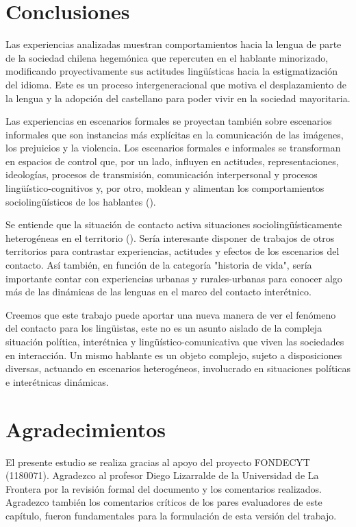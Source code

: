 \documentclass[output=paper]{../langscibook}
\begin{document}
\section{Conclusiones}\label{sec:olate:7}


Las experiencias analizadas muestran comportamientos hacia la lengua de parte de la sociedad chilena hegemónica que repercuten en el hablante minorizado, modificando proyectivamente sus actitudes lingüísticas hacia la estigmatización del idioma. Este es un proceso intergeneracional que motiva el desplazamiento de la lengua y la adopción del castellano para poder vivir en la sociedad mayoritaria.

Las experiencias en escenarios formales se proyectan también sobre escenarios informales que son instancias más explícitas en la comunicación de las imágenes, los prejuicios y la violencia. Los escenarios formales e informales se transforman en espacios de control que, por un lado, influyen en actitudes, representaciones, ideologías, procesos de transmisión, comunicación interpersonal y procesos lingüístico-cognitivos y, por otro, moldean y alimentan los comportamientos sociolingüísticos de los hablantes (\citealt{OlateVinet2017a}).

Se entiende que la situación de contacto activa situaciones sociolingüísticamente heterogéneas en el territorio (\citealt{WittigGonzálezOlateVinet2016}). Sería interesante disponer de trabajos de otros territorios para contrastar experiencias, actitudes y efectos de los escenarios del contacto. Así también, en función de la categoría "historia de vida", sería importante contar con experiencias urbanas y rurales-urbanas para conocer algo más de las dinámicas de las lenguas en el marco del contacto interétnico.

Creemos que este trabajo puede aportar una nueva manera de ver el fenómeno del contacto para los lingüistas, este no es un asunto aislado de la compleja situación política, interétnica y lingüístico-comunicativa que viven las sociedades en interacción. Un mismo hablante es un objeto complejo, sujeto a disposiciones diversas, actuando en escenarios heterogéneos, involucrado en situaciones políticas e interétnicas dinámicas.


\section*{Agradecimientos}
\largerpage

El presente estudio se realiza gracias al apoyo del proyecto FONDECYT (1180071). Agradezco al profesor Diego Lizarralde de la Universidad de La Frontera por la revisión formal del documento y los comentarios realizados. Agradezco también los comentarios críticos de los pares evaluadores de este capítulo, fueron fundamentales para la formulación de esta versión del trabajo.



\sloppy\printbibliography[heading=subbibliography,notkeyword=this]
\end{document}
